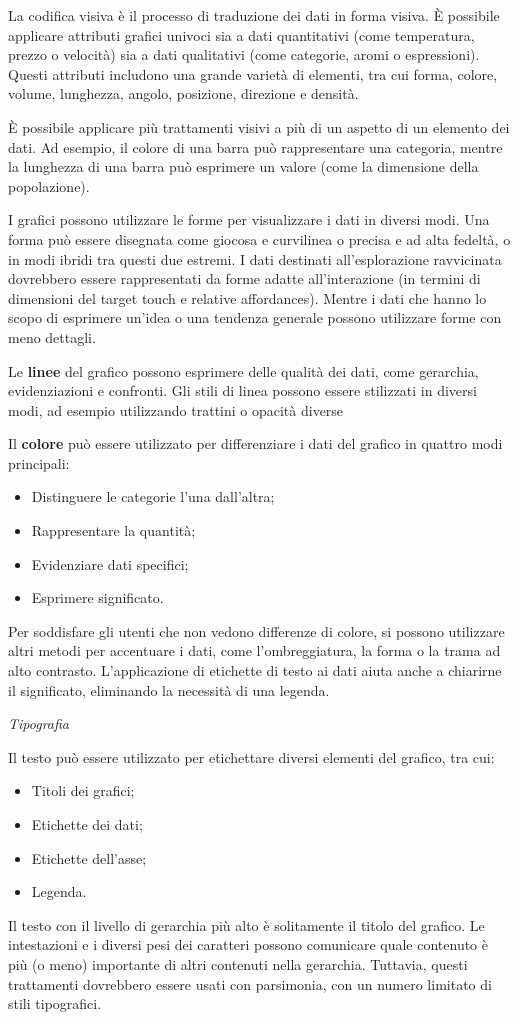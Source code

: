 \documentclass[12pt, a4paper]{report}
\begin{document}
	La codifica visiva è il processo di traduzione dei dati in forma visiva. È possibile applicare attributi grafici univoci sia a dati quantitativi (come temperatura, prezzo o velocità) sia a dati qualitativi (come categorie, aromi o espressioni). Questi attributi includono una grande varietà di elementi, tra cui forma, colore, volume, lunghezza, angolo, posizione, direzione e densità.

	È possibile applicare più trattamenti visivi a più di un aspetto di un elemento dei dati. Ad esempio, il colore di una barra può rappresentare una categoria, mentre la lunghezza di una barra può esprimere un valore (come la dimensione della popolazione).

	I grafici possono utilizzare le forme per visualizzare i dati in diversi modi. Una forma può essere disegnata come giocosa e curvilinea o precisa e ad alta fedeltà, o in modi ibridi tra questi due estremi. I dati destinati all'esplorazione ravvicinata dovrebbero essere rappresentati da forme adatte all'interazione (in termini di dimensioni del target touch
	e relative affordances). Mentre i dati che hanno lo scopo di esprimere un'idea o una tendenza generale possono utilizzare forme con meno dettagli.

	Le \textbf{linee} del grafico possono esprimere delle qualità dei dati, come gerarchia, evidenziazioni e confronti. Gli stili di linea possono essere stilizzati in diversi modi, ad esempio utilizzando trattini o opacità diverse

	Il \textbf{colore} può essere utilizzato per differenziare i dati del grafico in quattro modi principali:
	\begin{itemize}
		\item Distinguere le categorie l'una dall'altra;
		\item Rappresentare la quantità;
		\item Evidenziare dati specifici;
		\item Esprimere significato.
	\end{itemize}
	Per soddisfare gli utenti che non vedono differenze di colore, si possono utilizzare altri metodi per accentuare i dati, come l'ombreggiatura, la forma o la trama ad alto contrasto. L'applicazione di etichette di testo ai dati aiuta anche a chiarirne il significato, eliminando la necessità di una legenda.

	\textit{Tipografia}

	Il testo può essere utilizzato per etichettare diversi elementi del grafico, tra cui:
	\begin{itemize}
		\item Titoli dei grafici;
		\item Etichette dei dati;
		\item Etichette dell'asse;
		\item Legenda.
	\end{itemize}
	Il testo con il livello di gerarchia più alto è solitamente il titolo del grafico. Le intestazioni e i diversi pesi dei caratteri possono comunicare quale contenuto è più (o meno) importante di altri contenuti nella gerarchia. Tuttavia, questi trattamenti dovrebbero essere usati con parsimonia, con un numero limitato di stili tipografici.
\end{document}
